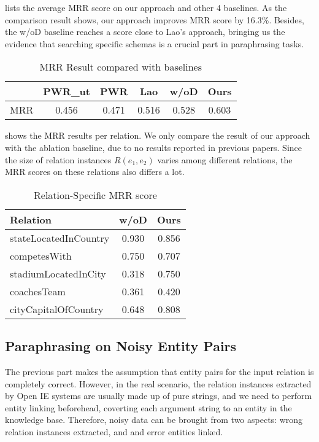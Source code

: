  lists the average MRR score on our approach and other 4 baselines.
As the comparison result shows, our approach improves MRR score by 16.3\%. Besides,
the w/oD baseline reaches a score close to Lao's approach, bringing us the evidence
that searching specific schemas is a crucial part in paraphrasing tasks.

\begin{table}[ht]
	\centering
	\caption{MRR Result compared with baselines}
	\begin{tabular}{|c|c|c|c|c|c|}
        \hline
				 & PWR\_ut & PWR & Lao & w/oD & Ours \\
        \hline
        MRR		 & 0.456 & 0.471 & 0.516 & 0.528 & 0.603 \\
        \hline
	\end{tabular}%
	\label{tab:mrr}%
\end{table}

 shows the MRR results per relation. We only compare the
result of our approach with the ablation baseline, due to no results reported in previous papers.
Since the size of relation instances $R(e_1, e_2)$ varies among different relations, 
the MRR scores on these relations also differs a lot.

\begin{table}[ht]
	\centering
	\caption{Relation-Specific MRR score}
	\label{tab:emnlp-relation-specific}
	\begin{tabular}{|l|c|c|}
		\hline
			Relation & w/oD & Ours \\
		\hline
			stateLocatedInCountry & 0.930 & 0.856 \\
		\hline
			competesWith & 0.750 & 0.707 \\
		\hline
			stadiumLocatedInCity & 0.318 & 0.750 \\
		\hline
			coachesTeam & 0.361 & 0.420 \\
		\hline
			cityCapitalOfCountry & 0.648 & 0.808 \\
		\hline
	\end{tabular}
\end{table}



\subsection{Paraphrasing on Noisy Entity Pairs}
The previous part makes the assumption that entity pairs for the input relation
is completely correct. However, in the real scenario, the relation instances extracted
by Open IE systems are usually made up of pure strings, and we need to perform
entity linking beforehead, coverting each argument string to an entity in the knowledge base. 
Therefore, noisy data can be brought from two aspects: wrong relation instances extracted,
and and error entities linked. 

